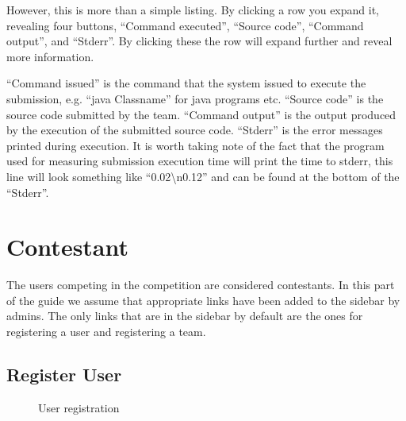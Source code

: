 \bigskip

However, this is more than a simple listing. By clicking a row you
expand it, revealing four buttons, {\textquotedblleft}Command
executed{\textquotedblright}, {\textquotedblleft}Source
code{\textquotedblright}, {\textquotedblleft}Command
output{\textquotedblright}, and
{\textquotedblleft}Stderr{\textquotedblright}. By clicking these the
row will expand further and reveal more information. 


\bigskip

{\textquotedblleft}Command issued{\textquotedblright} is the command
that the system issued to execute the submission, e.g.
{\textquotedblleft}java Classname{\textquotedblright} for java programs
etc. {\textquotedblleft}Source code{\textquotedblright} is the source
code submitted by the team. {\textquotedblleft}Command
output{\textquotedblright} is the output produced by the execution of
the submitted source code.
{\textquotedblleft}Stderr{\textquotedblright} is the error messages
printed during execution. It is worth taking note of the fact that the
program used for measuring submission execution time will print the
time to stderr, this line will look something like
{\textquotedblleft}0.02{\textbackslash}n0.12{\textquotedblright} and
can be found at the bottom of the
{\textquotedblleft}Stderr{\textquotedblright}. 


\section{Contestant}

The users competing in the competition are considered contestants. In
this part of the guide we assume that appropriate links have been added
to the sidebar by admins. The only links that are in the sidebar by
default are the ones for registering a user and registering a team.

\subsection{Register User}

\begin{figure}
\centering
	\caption{User registration}
	\label{fig:userReg}
\end{figure}

